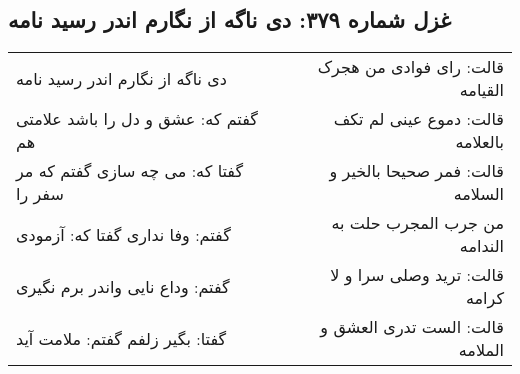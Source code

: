 \begin{center}
\section*{غزل شماره ۳۷۹: دی ناگه از نگارم اندر رسید نامه}
\label{sec:379}
\begin{longtable}{l p{0.5cm} r}
دی ناگه از نگارم اندر رسید نامه
&&
قالت: رای فوادی من هجرک القیامه
\\
گفتم که: عشق و دل را باشد علامتی هم
&&
قالت: دموع عینی لم تکف بالعلامه
\\
گفتا که: می چه سازی گفتم که مر سفر را
&&
قالت: فمر صحیحا بالخیر و السلامه
\\
گفتم: وفا نداری گفتا که: آزمودی
&&
من جرب المجرب حلت به الندامه
\\
گفتم: وداع نایی واندر برم نگیری
&&
قالت: ترید وصلی سرا و لا کرامه
\\
گفتا: بگیر زلفم گفتم: ملامت آید
&&
قالت: الست تدری العشق و الملامه
\\
\end{longtable}
\end{center}
